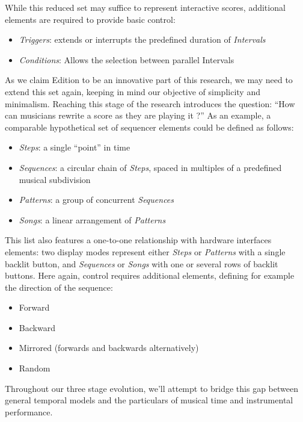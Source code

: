 \documentclass[journal,onecolumn]{IEEEtran}
\begin{document}
While this reduced set may suffice to represent interactive scores, additional elements are required to provide basic control:
\begin{itemize}
    \item \textit{Triggers}: extends or interrupts the predefined duration of \textit{Intervals}
    \item \textit{Conditions}: Allows the selection between parallel Intervals
\end{itemize}
As we claim Edition to be an innovative part of this research, we may need to extend this set again, keeping in mind our objective of simplicity and minimalism. Reaching this stage of the research introduces the question: ``How can musicians rewrite a score as they are playing it ?''
As an example, a comparable hypothetical set of sequencer elements could be defined as follows:
\begin{itemize}
    \item \textit{Steps}: a single ``point'' in time
    \item \textit{Sequences}: a circular chain of \textit{Steps}, spaced in multiples of a predefined musical subdivision
    \item \textit{Patterns}: a group of concurrent \textit{Sequences}
    \item \textit{Songs}: a linear arrangement of \textit{Patterns}
\end{itemize}
This list also features a one-to-one relationship with hardware interfaces elements: two display modes represent either \textit{Steps} or \textit{Patterns} with a single backlit button, and \textit{Sequences} or \textit{Songs} with one or several rows of backlit buttons.
Here again, control requires additional elements, defining for example the direction of the sequence:
\begin{itemize}
    \item Forward
    \item Backward
    \item Mirrored (forwards and backwards alternatively)
    \item Random
\end{itemize}
Throughout our three stage evolution, we'll attempt to bridge this gap between general temporal models and the particulars of musical time and instrumental performance. 

\end{document}
